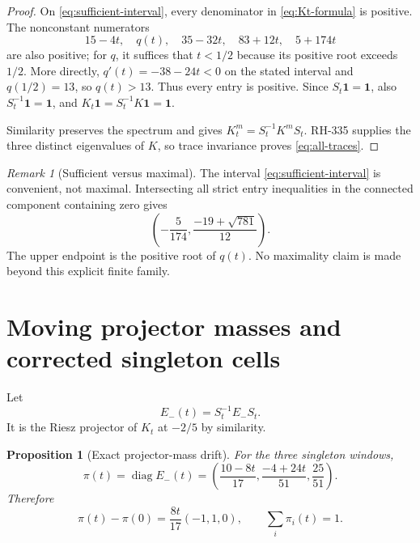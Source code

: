 \documentclass[11pt]{article}
\newtheorem{proposition}[theorem]{Proposition}
\theoremstyle{remark}
\newtheorem{remark}[theorem]{Remark}
\newcommand{\one}{\mathbf 1}
\begin{document}
\begin{proof}
On \eqref{eq:sufficient-interval}, every denominator in
\eqref{eq:Kt-formula} is positive.  The nonconstant numerators
\[
 15-4t,\quad q(t),\quad35-32t,\quad83+12t,\quad5+174t
\]
are also positive; for $q$, it suffices that $t<1/2$ because its positive
root exceeds $1/2$.  More directly, $q'(t)=-38-24t<0$ on the stated
interval and $q(1/2)=13$, so $q(t)>13$.  Thus every entry is positive.  Since
$S_t\one=\one$, also $S_t^{-1}\one=\one$, and
$K_t\one=S_t^{-1}K\one=\one$.

Similarity preserves the spectrum and gives
$K_t^m=S_t^{-1}K^mS_t$.  RH-335 supplies the three distinct eigenvalues of
$K$, so trace invariance proves \eqref{eq:all-traces}.
\end{proof}

\begin{remark}[Sufficient versus maximal]
The interval \eqref{eq:sufficient-interval} is convenient, not maximal.
Intersecting all strict entry inequalities in the connected component
containing zero gives
\begin{equation}\label{eq:maximal-interval}
 \left(-\frac5{174},\frac{-19+\sqrt{781}}{12}\right).
\end{equation}
The upper endpoint is the positive root of $q(t)$.  No maximality claim is
made beyond this explicit finite family.
\end{remark}

\section{Moving projector masses and corrected singleton cells}

Let
\begin{equation}\label{eq:Et}
 E_-(t)=S_t^{-1}E_-S_t.
\end{equation}
It is the Riesz projector of $K_t$ at $-2/5$ by similarity.

\begin{proposition}[Exact projector-mass drift]
\label{prop:pi-drift}
For the three singleton windows,
\begin{equation}\label{eq:pi-t}
 \boxed{
 \pi(t)=\operatorname{diag}E_-(t)
 =\left(\frac{10-8t}{17},\frac{-4+24t}{51},\frac{25}{51}\right).}
\end{equation}
Therefore
\begin{equation}\label{eq:pi-drift}
 \pi(t)-\pi(0)=\frac{8t}{17}(-1,1,0),
 \qquad \sum_i\pi_i(t)=1.
\end{equation}
\end{proposition}
\end{document}
